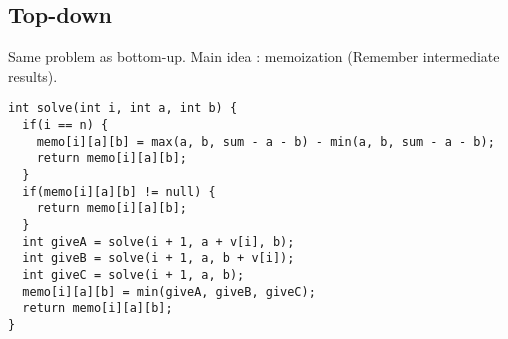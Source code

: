 \subsection{Top-down}
Same problem as bottom-up. Main idea : memoization (Remember intermediate results).
\newline
\begin{lstlisting}
int solve(int i, int a, int b) {
  if(i == n) {
    memo[i][a][b] = max(a, b, sum - a - b) - min(a, b, sum - a - b);
    return memo[i][a][b]; 
  }
  if(memo[i][a][b] != null) {
    return memo[i][a][b];
  }
  int giveA = solve(i + 1, a + v[i], b);
  int giveB = solve(i + 1, a, b + v[i]);
  int giveC = solve(i + 1, a, b);
  memo[i][a][b] = min(giveA, giveB, giveC);
  return memo[i][a][b];
}
\end{lstlisting}